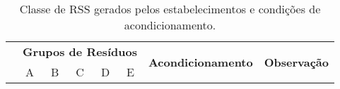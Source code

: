 \begin{table}[htbp]
	\centering
	\caption{Classe de RSS gerados pelos estabelecimentos e condições de acondicionamento.}

\begin{tabular}{|cccccccc|}
	\rowcolor[rgb]{ .969,  .588,  .275} 
	\multicolumn{1}{c}{} & 
	\multicolumn{5}{c}{\textbf{Grupos de Resíduos}} & \multicolumn{1}{c}{\multirow{2}{*}{\textbf{Acondicionamento}}} & \multicolumn{1}{c}{\multirow{2}{*}{\textbf{Observação}}} \\
	
	\rowcolor[rgb]{ .969,  .588,  .275} \multicolumn{1}{c}{} & \multicolumn{1}{c}{A} & 
	\multicolumn{1}{c}{B} & 
	\multicolumn{1}{c}{C} & 
	\multicolumn{1}{c}{D} & 
	\multicolumn{1}{c}{E} &
	\multicolumn{1}{c}{}  &
	\multicolumn{1}{c}{}\\
	

\end{tabular}
\end{table}
